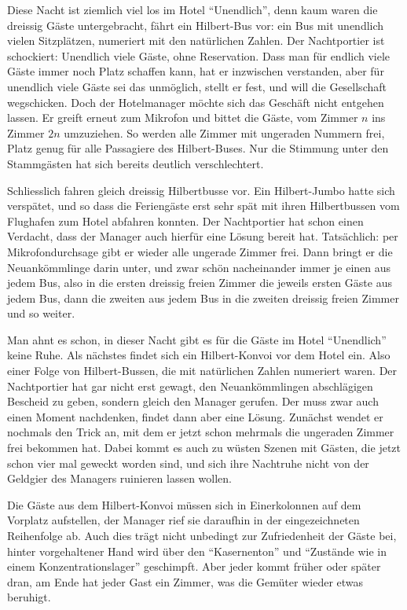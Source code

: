 Diese Nacht ist ziemlich viel los im Hotel ``Unendlich'', denn
kaum waren die dreissig Gäste untergebracht, fährt ein Hilbert-Bus
vor: ein Bus mit unendlich vielen Sitzplätzen, numeriert mit den
natürlichen Zahlen. Der Nachtportier ist schockiert: Unendlich
viele Gäste, ohne Reservation. Dass man für endlich viele Gäste
immer noch Platz schaffen kann, hat er inzwischen verstanden, aber
für unendlich viele Gäste sei das unmöglich, stellt er fest, und
will die Gesellschaft wegschicken. Doch der Hotelmanager möchte
sich das Geschäft nicht entgehen lassen. Er greift erneut zum
Mikrofon und bittet die Gäste, vom Zimmer $n$ ins Zimmer $2n$ umzuziehen.
So werden alle Zimmer mit ungeraden Nummern frei, Platz genug für alle
Passagiere des Hilbert-Buses. Nur die Stimmung unter den Stammgästen
hat sich bereits deutlich verschlechtert.

Schliesslich fahren gleich dreissig Hilbertbusse vor. Ein Hilbert-Jumbo
hatte sich verspätet, und so dass die Feriengäste erst sehr spät
mit ihren Hilbertbussen vom Flughafen zum Hotel abfahren konnten.
Der Nachtportier hat schon einen Verdacht, dass der Manager auch
hierfür eine Lösung bereit hat. Tatsächlich: per Mikrofondurchsage
gibt er wieder alle ungerade Zimmer frei. Dann bringt er die Neuankömmlinge
darin unter, und zwar schön nacheinander immer je einen aus jedem Bus,
also in die ersten dreissig freien Zimmer die jeweils ersten Gäste
aus jedem Bus, dann die zweiten aus jedem Bus in die zweiten dreissig
freien Zimmer und so weiter.

Man ahnt es schon, in dieser Nacht gibt es für die Gäste im Hotel
``Unendlich'' keine Ruhe. Als nächstes findet sich ein Hilbert-Konvoi
vor dem Hotel ein. Also einer Folge von Hilbert-Bussen, die mit natürlichen
Zahlen numeriert waren. Der Nachtportier hat gar nicht erst gewagt,
den Neuankömmlingen abschlägigen Bescheid zu geben, sondern gleich
den Manager gerufen. Der muss zwar auch einen Moment nachdenken, findet
dann aber eine Lösung. Zunächst wendet er nochmals den Trick an,
mit dem er jetzt schon mehrmals die ungeraden Zimmer frei bekommen hat.
Dabei kommt es auch zu wüsten Szenen mit Gästen, die jetzt schon vier mal
geweckt worden sind, und sich ihre Nachtruhe nicht von der Geldgier des
Managers ruinieren lassen wollen.

Die Gäste aus dem Hilbert-Konvoi müssen sich in Einerkolonnen auf
dem Vorplatz aufstellen, der Manager rief sie daraufhin in der
eingezeichneten Reihenfolge ab. Auch dies trägt nicht  unbedingt
zur Zufriedenheit der Gäste bei, hinter vorgehaltener Hand wird
über den ``Kasernenton'' und ``Zustände wie in einem Konzentrationslager''
geschimpft.
Aber jeder kommt früher oder später dran,
am Ende hat jeder Gast ein Zimmer, was die Gemüter wieder
etwas beruhigt.

